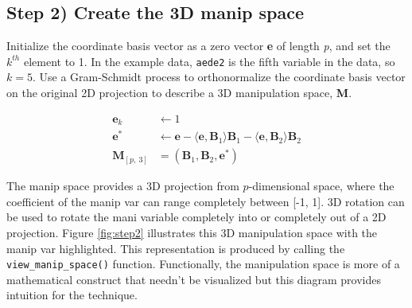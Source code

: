 \hypertarget{step-2-create-the-3d-manip-space}{%
\subsection{Step 2) Create the 3D manip
space}\label{step-2-create-the-3d-manip-space}}

Initialize the coordinate basis vector as a zero vector \textbf{e} of
length \emph{p}, and set the \(k^{th}\) element to 1. In the example
data, \texttt{aede2} is the fifth variable in the data, so \(k=5\). Use
a Gram-Schmidt process to orthonormalize the coordinate basis vector on
the original 2D projection to describe a 3D manipulation space,
\textbf{M}.

\begin{align*}
  \textbf{e}_k &\leftarrow 1 \\ 
  \textbf{e}^*   &\leftarrow \textbf{e} - \langle \textbf{e}, \textbf{B}_1 \rangle \textbf{B}_1 - \langle \textbf{e}, \textbf{B}_2 \rangle \textbf{B}_2 \\ 
  \textbf{M}_{[p,~3]} &= (\textbf{B}_1,\textbf{B}_2,\textbf{e}^*)
\end{align*}

The manip space provides a 3D projection from \(p\)-dimensional space,
where the coefficient of the manip var can range completely between
{[}-1, 1{]}. 3D rotation can be used to rotate the mani variable
completely into or completely out of a 2D projection. Figure
\ref{fig:step2} illustrates this 3D manipulation space with the manip
var highlighted. This representation is produced by calling the
\texttt{view\_manip\_space()} function. Functionally, the manipulation
space is more of a mathematical construct that needn't be visualized but
this diagram provides intuition for the technique.

